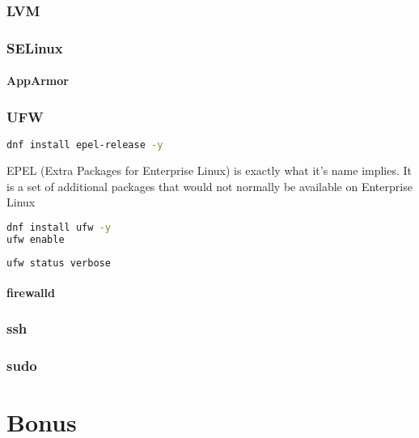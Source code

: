 \documentclass[a4paper]{article}
\begin{document}
\subsubsection{LVM}

\subsubsection{SELinux}
\paragraph{AppArmor}

\subsubsection{UFW}
\begin{lstlisting}[language=Bash]
dnf install epel-release -y
\end{lstlisting}
EPEL (Extra Packages for Enterprise Linux) is exactly what it's name implies. It is a set of additional packages that would not normally be available on Enterprise Linux
\begin{lstlisting}[language=Bash]
dnf install ufw -y
ufw enable
\end{lstlisting}
\begin{lstlisting}[language=Bash]
ufw status verbose
\end{lstlisting}
\paragraph{firewalld}

\subsubsection{ssh}

\subsubsection{sudo}

\section{Bonus}
\end{document}
